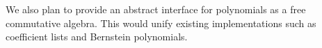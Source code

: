 \documentclass[a4paper,10pt,runningheads]{llncs}
\begin{document}
We also plan to provide an abstract interface for polynomials as a free commutative algebra. This would unify existing implementations such as coefficient lists and Bernstein polynomials.





\end{document}
